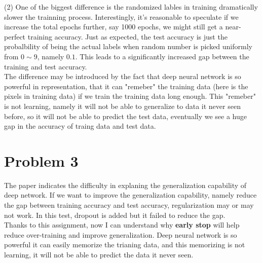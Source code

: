 \documentclass[12pt]{article}
\begin{document}
(2) One of the biggest difference is the randomized lables in training
dramatically slower the trainning process. Interestingly, it's
reasonable to speculate if we increase the total epochs further, say
1000 epochs, we might still get a near\--perfect training accuracy. 
Just as expected, the test accuracy is just the probalbility of being
the actual labels when random number is picked uniformly from $0\sim9$,
namely $0.1$. This leads to a significantly increased gap between the
training and test accuracy.\\
The difference may be introduced by the fact that deep neural network
is so powerful in representation, that it can "remeber" the training
data (here is the pixels in training data) if we train the training
data long enough. This "remeber" is not learning, namely it will not be
able to generalize to data it never seen before, so it will not be able 
to predict the test data, eventually we see a huge gap in the accuracy
of traing data and test data.

\section{Problem 3}
The paper indicates the difficulty in explaning the generalization
capability of deep network. If we want to improve the generalization 
capability, namely reduce the gap between training accuracy and test
accuracy, regularization may or may not work. In this test, dropout is
added but it failed to reduce the gap.\\
Thanks to this assignment, now I can understand why \textbf{early stop} will
help reduce over\--training and improve generalization. Deep neural
network is so powerful it can easily memorize the trianing data, and
this memorizing is not learning, it will not be able to predict the
data it never seen.
\end{document}
